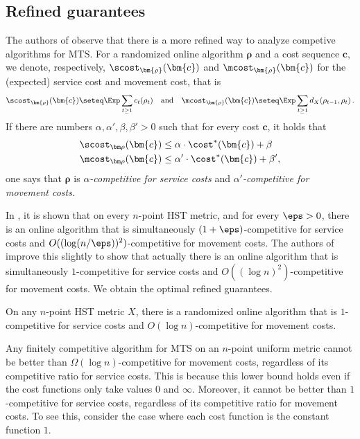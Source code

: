 \subsection{Refined guarantees}

The authors of \cite{BBN10} observe that there is a more refined way to analyze
competive algorithms for MTS.
For a randomized online algorithm $\bm{\rho}$ and a cost sequence $\bm{c}$, we denote, respectively, $\scost_{\bm{\rho}}(\bm{c})$
and $\mcost_{\bm{\rho}}(\bm{c})$ for the (expected) service cost and movement cost, that is
\[
\scost_{\bm{\rho}}(\bm{c}) \seteq \Exp \sum_{t \geq 1} c_t(\rho_t) \quad \text{and}\quad \mcost_{\bm{\rho}}(\bm{c}) \seteq \Exp \sum_{t\geq1}d_X(\rho_{t-1}, \rho_t) \,.
\]
If there are numbers $\alpha,\alpha',\beta,\beta' > 0$ such that
for every cost $\bm{c}$, it holds that
\begin{align*}
\scost_{\bm\rho}(\bm{c}) &\leq \alpha \cdot \cost^*(\bm{c})+\beta \\
\mcost_{\bm\rho}(\bm{c}) &\leq \alpha' \cdot \cost^*(\bm{c})+\beta',
\end{align*}
one says that $\bm{\rho}$ is \emph{$\alpha$-competitive for service costs} and \emph{$\alpha'$-competitive for movement costs.}

In \cite{BBN10}, it is shown that on every $n$-point HST metric, and
for every $\eps > 0$, there is an online algorithm that is simultaneously
$(1+\eps)$-competitive for service costs and $O((\log (n/\eps))^2)$-competitive for movement costs.
The authors of \cite{BCLL19} improve this slightly to show that actually
there is an online algorithm that is simultaneously $1$-competitive for service costs
and $O((\log n)^2)$-competitive for movement costs.
We obtain the optimal refined guarantees.

\begin{theorem} \label{thm:refined}
	On any $n$-point HST metric $X$, there
	is a randomized  online algorithm that is $1$-competitive for service costs and $O(\log n)$-competitive for movement costs.
\end{theorem}

\begin{remark}
	Any finitely competitive algorithm for MTS on an $n$-point uniform metric
	cannot be better than $\Omega(\log n)$-competitive for movement costs,
	regardless of its competitive ratio for service costs. This is because this lower bound holds even if the cost functions only take values $0$ and $\infty$. Moreover, it cannot be better than $1$-competitive for service costs, regardless of its competitive ratio for movement costs. To see this, consider the case where each cost function is the constant function $1$.
\end{remark}

